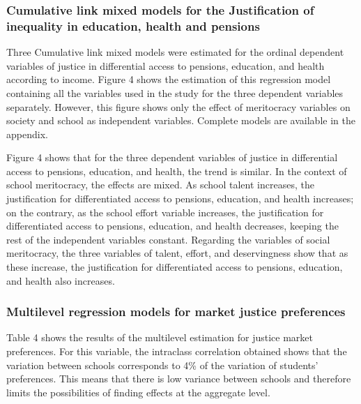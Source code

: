 \documentclass[
  letterpaper,
  DIV=11,
  numbers=noendperiod]{scrartcl}
\begin{document}
\subsubsection{Cumulative link mixed models for the Justification of
inequality in education, health and
pensions}\label{cumulative-link-mixed-models-for-the-justification-of-inequality-in-education-health-and-pensions}

Three Cumulative link mixed models were estimated for the ordinal
dependent variables of justice in differential access to pensions,
education, and health according to income. Figure 4 shows the estimation
of this regression model containing all the variables used in the study
for the three dependent variables separately. However, this figure shows
only the effect of meritocracy variables on society and school as
independent variables. Complete models are available in the appendix.

Figure 4 shows that for the three dependent variables of justice in
differential access to pensions, education, and health, the trend is
similar. In the context of school meritocracy, the effects are mixed. As
school talent increases, the justification for differentiated access to
pensions, education, and health increases; on the contrary, as the
school effort variable increases, the justification for differentiated
access to pensions, education, and health decreases, keeping the rest of
the independent variables constant. Regarding the variables of social
meritocracy, the three variables of talent, effort, and deservingness
show that as these increase, the justification for differentiated access
to pensions, education, and health also increases.

\subsubsection{Multilevel regression models for market justice
preferences}\label{multilevel-regression-models-for-market-justice-preferences}

Table 4 shows the results of the multilevel estimation for justice
market preferences. For this variable, the intraclass correlation
obtained shows that the variation between schools corresponds to 4\% of
the variation of students' preferences. This means that there is low
variance between schools and therefore limits the possibilities of
finding effects at the aggregate level.
\end{document}
